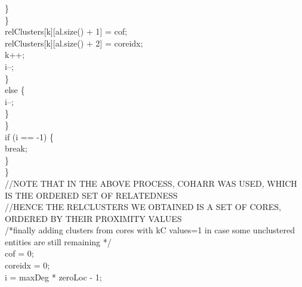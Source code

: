 \begin{ttfamily   }
\begin{scriptsize}
                        \}\\
                    \}\\
                    relClusters[k][al.size() + 1] = cof;\\
                    relClusters[k][al.size() + 2] = coreidx;\\
                    k++;\\
                    i--;\\
                \}\\ else \{\\
                    i--;\\
                \}\\
            \}\\
            if (i == -1) \{\\
                break;\\
            \}\\
        \}\\
        \noindent//NOTE THAT IN THE ABOVE PROCESS, COHARR WAS USED, WHICH IS THE ORDERED SET OF RELATEDNESS\\
        \noindent//HENCE THE RELCLUSTERS WE OBTAINED IS A SET OF CORES, ORDERED BY THEIR PROXIMITY VALUES\\


        \noindent /*finally adding clusters from cores with kC values=1
          in case some unclustered entities are still remaining
         */\\
        cof = 0;\\
        coreidx = 0;\\
        i = maxDeg * zeroLoc - 1;\\


\end{scriptsize}
\end{ttfamily   }
